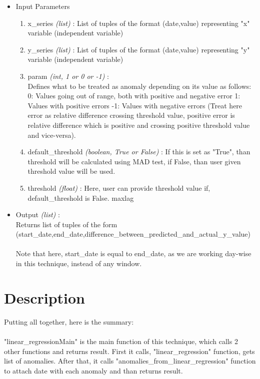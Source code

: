 \begin{itemize}
 \item Input Parameters
 
 \begin{enumerate}
  \item x\_series \textit{(list)} : List of tuples of the format (date,value) representing "x" variable (independent variable)
  \item y\_series \textit{(list)} : List of tuples of the format (date,value) representing "y" variable (independent variable)
  \item param \textit{(int, 1 or 0 or -1)} : \\
  		Defines what to be treated as anomaly depending on its value as follows:
        0: Values going out of range, both with positive and negative error
        1: Values with positive errors
        -1: Values with negative errors
        (Treat here error as relative difference crossing threshold value, positive error is relative difference which is positive and crossing positive threshold value and vice-versa).
  \item default\_threshold \textit{(boolean, True or False)} : If this is set as "True", than threshold will be calculated using MAD test, if False, than user given threshold value will be used.
  \item threshold \textit{(float)} : Here, user can provide threshold value if, default\_threshold is False.
maxlag
 \end{enumerate}

 \item Output \textit{(list)} : \\
 	Returns list of tuples of the form \\
 	(start\_date,end\_date,difference\_between\_predicted\_and\_actual\_y\_value) \\
 	\\
 	Note that here, start\_date is equal to end\_date, as we are working day-wise in this technique, instead of any window.
 
\end{itemize}

\section{Description}

Putting all together, here is the summary:\\
\\
"linear\_regressionMain" is the main function of this technique, which calls 2 other functions and returns result. First it calls, "linear\_regression" function, gets list of anomalies. After that, it calls "anomalies\_from\_linear\_regression" function to attach date with each anomaly and than returns result.